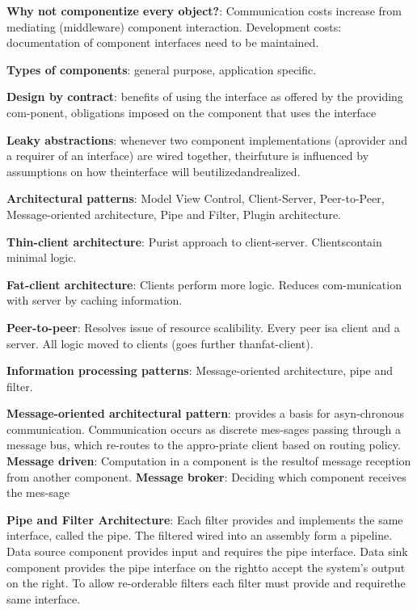 \documentclass{article}
\begin{document}
\noindent \textbf{Why not componentize every object?}:
Communication costs increase from mediating (middleware) component interaction.
Development costs: documentation of component interfaces need to be maintained.

\noindent \textbf{Types of components}: general purpose, application specific.

\noindent \textbf{Design by contract}: benefits of using the interface as offered by the providing com-ponent, obligations imposed on the component that uses the interface

\noindent \textbf{Leaky abstractions}: whenever two component implementations (aprovider and a requirer of an interface) are wired together, theirfuture is influenced by assumptions on how theinterface will beutilizedandrealized.

\noindent \textbf{Architectural patterns}: Model View Control, Client-Server, Peer-to-Peer, Message-oriented architecture, Pipe and Filter, Plugin architecture.

\noindent \textbf{Thin-client architecture}: Purist approach to client-server. Clientscontain minimal logic.

\noindent \textbf{Fat-client architecture}: Clients perform more logic. Reduces com-munication with server by caching information.

\noindent \textbf{Peer-to-peer}: Resolves issue of resource scalibility. Every peer isa client and a server. All logic moved to clients (goes further thanfat-client).

\noindent \textbf{Information processing patterns}: Message-oriented architecture, pipe and filter.

\noindent \textbf{Message-oriented architectural pattern}: provides a basis for asyn-chronous communication. 
Communication occurs as discrete mes-sages passing through a message bus, which re-routes to the appro-priate client based on routing policy.
\noindent \textbf{Message  driven}: Computation in a component is the resultof message reception from another component.
\noindent \textbf{Message broker}: Deciding which component receives the mes-sage

\noindent \textbf{Pipe and Filter Architecture}: Each filter provides and implements the same interface, called the pipe.
The filtered wired into an assembly form a pipeline.
Data source component provides input and requires the pipe interface.
Data sink component provides the pipe interface on the rightto accept the system’s output on the right.
To allow re-orderable filters each filter must provide and requirethe same interface.
\end{document}
